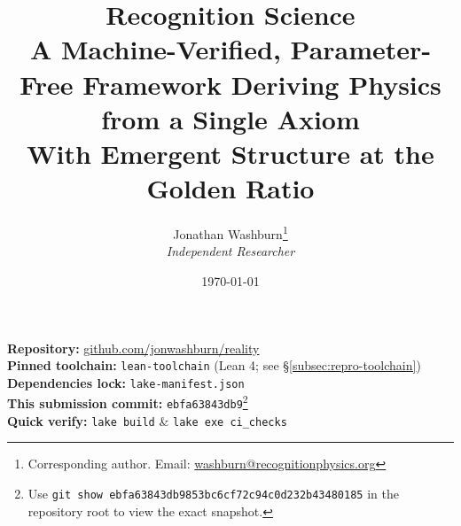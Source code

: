\documentclass[11pt,a4paper,twoside]{article}
\title{%
    \vspace{-2em}%
    {\huge\bfseries Recognition Science}\\[1em]
    {\Large A Machine-Verified, Parameter-Free Framework Deriving Physics from a Single Axiom}\\[0.8em]
    {\large With Emergent Structure at the Golden Ratio}\\[1.5em]
}
\author{
    Jonathan Washburn\thanks{Corresponding author. Email: \href{mailto:washburn@recognitionphysics.org}{washburn@recognitionphysics.org}}\\
    \textit{Independent Researcher}
}
\date{\today}
\numberwithin{equation}{section}
\theoremstyle{customthm}
\theoremstyle{customdef}
\theoremstyle{customrem}
\begin{document}
\maketitle

\begin{importantbox}
\small
\textbf{Repository:} \href{https://github.com/jonwashburn/reality}{github.com/jonwashburn/reality}\\
\textbf{Pinned toolchain:} \texttt{lean-toolchain} (Lean 4; see \S\ref{subsec:repro-toolchain})\\
\textbf{Dependencies lock:} \texttt{lake-manifest.json}\\
\textbf{This submission commit:} \texttt{ebfa63843db9}\footnote{Use \texttt{git show ebfa63843db9853bc6cf72c94c0d232b43480185} in the repository root to view the exact snapshot.}\\
\textbf{Quick verify:} \texttt{lake build} \;\&\; \texttt{lake exe ci\_checks}
\end{importantbox}
\end{document}
